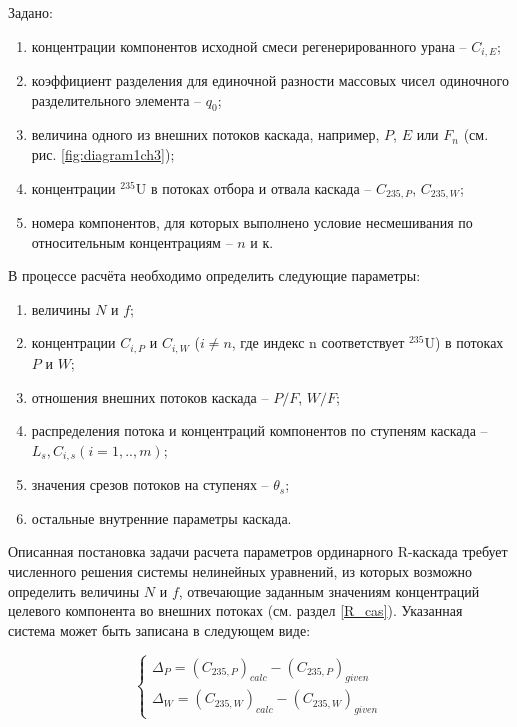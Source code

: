Задано: 

\begin{enumerate}
  \item концентрации компонентов исходной смеси регенерированного урана -- ${C}_{i,E}$;
  \item коэффициент разделения для единочной разности массовых чисел одиночного разделительного элемента -- ${q}_{0}$;
  \item величина одного из внешних потоков каскада, например, $P$, $E$ или $F_n$ (см. рис. \ref{fig:diagram1ch3});
  \item концентрации $^{235}$U в потоках отбора и отвала каскада -- ${C_{235, P}}$, ${C_{235, W}}$;
  \item номера компонентов, для которых выполнено условие несмешивания по относительным концентрациям -- $n$ и $к$.
\end{enumerate}

В процессе расчёта необходимо определить следующие параметры: 

\begin{enumerate}
  \item величины $N$ и $f$;
  \item концентрации ${C}_{i,P}$ и ${C}_{i,W}$ ($i \neq n$, где индекс n соответствует $^{235}$U) в потоках $P$ и $W$; 
  \item отношения внешних потоков каскада -- $P/F$, $W/F$;
  \item распределения потока и концентраций компонентов по ступеням каскада -- $L_{s}, C_{i,s} (i = 1,.., m)$;
  \item значения срезов потоков на ступенях -- $\theta_{s}$;
  \item остальные внутренние параметры каскада. 
\end{enumerate}

Описанная постановка задачи расчета параметров ординарного R-каскада требует численного решения системы нелинейных уравнений, из которых возможно определить величины $N$ и $f$, отвечающие заданным значениям концентраций целевого компонента во внешних потоках (см. раздел \ref{R_cas}). Указанная система может быть записана в следующем виде: 

\begin{equation}\label{dpdw}
  \begin{cases}
  \Delta_{P} = {(C_{235, P})}_{calc}-{(C_{235, P})}_{given}\\
  \Delta_{W} = {(C_{235, W})}_{calc}-{(C_{235, W})}_{given}
  \end{cases}\,
\end{equation}

